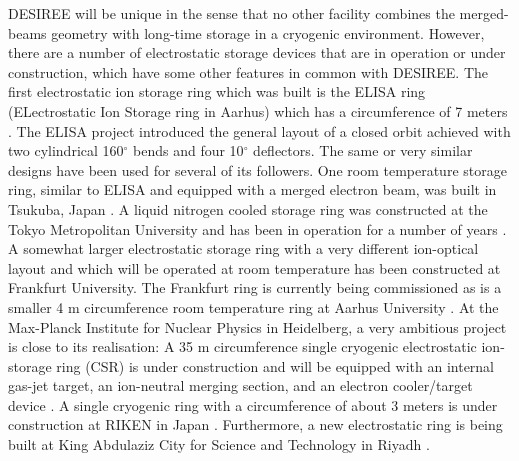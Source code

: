\documentclass[aps,pra,preprint,superscriptaddress]{revtex4}
\begin{document}
DESIREE will be unique in the sense that no other facility combines the merged-beams geometry with long-time storage in a cryogenic environment. However, there are a number of electrostatic storage devices that are in operation or under construction, which have some other features in common with DESIREE. The first electrostatic ion storage ring which was built is the ELISA ring (ELectrostatic Ion Storage ring in Aarhus) which has a circumference of 7 meters \cite{Mol97}. The ELISA project introduced the general layout of a closed orbit achieved with two cylindrical 160$^\circ$ bends and four 10$^\circ$ deflectors.
The same or very similar designs have been used for several of its followers.
One room temperature storage ring, similar to ELISA and equipped with a merged electron beam, was built in Tsukuba, Japan \cite{Tan03}. A liquid nitrogen cooled storage ring was constructed at the Tokyo Metropolitan University and has been in operation for a number of years \cite{Jin04}. A somewhat larger electrostatic storage ring with a very different ion-optical layout and which will be operated at room temperature \cite{Sti10} has been constructed at Frankfurt University. The Frankfurt ring is currently being commissioned as is a smaller 4 m circumference room temperature ring at Aarhus University \cite{lha13}. At the Max-Planck Institute for Nuclear Physics in Heidelberg, a very ambitious project is close to its realisation: A 35 m circumference single cryogenic electrostatic ion-storage ring (CSR) is under construction and will be equipped with an internal gas-jet target, an ion-neutral merging section, and an electron cooler/target device \cite{Hah11}. A single cryogenic ring with a circumference of about 3 meters is under construction at RIKEN in Japan \cite{Azu13}. Furthermore, a new electrostatic ring is being built at King Abdulaziz City for Science and Technology in Riyadh \cite{Gha13}.
\end{document}

